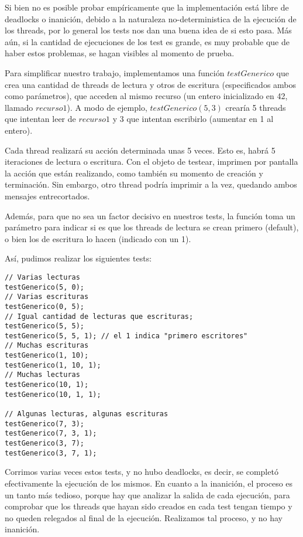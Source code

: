 Si bien no es posible probar empíricamente que la implementación está libre de deadlocks o inanición, debido a la naturaleza no-deterministica de la ejecución de los threads, por lo general los tests nos dan una buena idea de si esto pasa. Más aún, si la cantidad de ejecuciones de los test es grande, es muy probable que de haber estos problemas, se hagan visibles al momento de prueba. 

Para simplificar nuestro trabajo, implementamos una función $testGenerico$ que crea una cantidad de threads de lectura y otros de escritura (especificados ambos como parámetros), que acceden al mismo recurso (un entero inicializado en 42, llamado $recurso1$). A modo de ejemplo, $testGenerico(5, 3)$ crearía 5 threads que intentan leer de $recurso1$ y 3 que intentan escribirlo (aumentar en 1 al entero). 

Cada thread realizará su acción determinada unas 5 veces. Esto es, habrá 5 iteraciones de lectura o escritura. Con el objeto de testear, imprimen por pantalla la acción que están realizando, como también su momento de creación y terminación. Sin embargo, otro thread podría imprimir a la vez, quedando ambos mensajes entrecortados.

Además, para que no sea un factor decisivo en nuestros tests, la función toma un parámetro para indicar si es que los threads de lectura se crean primero (default), o bien los de escritura lo hacen (indicado con un 1). 

Así, pudimos realizar los siguientes tests: 

\begin{lstlisting}
// Varias lecturas
testGenerico(5, 0);
// Varias escrituras
testGenerico(0, 5);
// Igual cantidad de lecturas que escrituras;
testGenerico(5, 5);
testGenerico(5, 5, 1); // el 1 indica "primero escritores"
// Muchas escrituras
testGenerico(1, 10);
testGenerico(1, 10, 1);
// Muchas lecturas
testGenerico(10, 1);
testGenerico(10, 1, 1);

// Algunas lecturas, algunas escrituras
testGenerico(7, 3);
testGenerico(7, 3, 1);
testGenerico(3, 7);
testGenerico(3, 7, 1);
\end{lstlisting}

Corrimos varias veces estos tests, y no hubo deadlocks, es decir, se completó efectivamente la ejecución de los mismos. En cuanto a la inanición, el proceso es un tanto más tedioso, porque hay que analizar la salida de cada ejecución, para comprobar que los threads que hayan sido creados en cada test tengan tiempo y no queden relegados al final de la ejecución. Realizamos tal proceso, y no hay inanición.